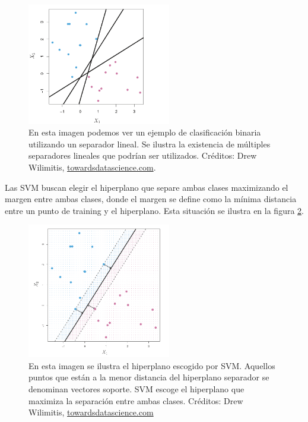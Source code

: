 \begin{figure}[h!]
\begin{center}
  \includegraphics[width=0.56\textwidth]{Kap1/svm1.png} 
\end{center}
\caption{ En esta imagen podemos ver un ejemplo de clasificación binaria utilizando un separador lineal. Se ilustra la existencia de múltiples separadores lineales que podrían ser utilizados. Créditos: Drew Wilimitis, \url{towardsdatascience.com}.}
\label{fig:sv1}
\end{figure}

Las SVM buscan elegir el hiperplano que separe ambas clases maximizando el margen entre ambas clases, donde el margen se define como la mínima distancia entre un punto de training y el hiperplano. Esta situación se ilustra en la figura \ref{fig:svm_3}. \\

\begin{figure}[h!]
\begin{center}
  \includegraphics[width=0.56\textwidth]{Kap1/svm3.png} 
  \end{center}
 \caption{En esta imagen se ilustra el hiperplano escogido por SVM. Aquellos puntos que están a la menor distancia del hiperplano separador se denominan vectores soporte. SVM escoge el hiperplano que maximiza la separación entre ambas clases. Créditos: Drew Wilimitis, \url{towardsdatascience.com}}
\label{fig:svm_3}
\end{figure}



